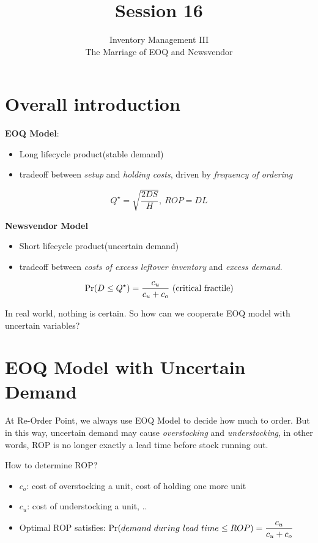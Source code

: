 \documentclass[11pt, a4paper]{ISOM2700}
\title{Session 16}
\subtitle{Inventory Management III\\The Marriage of EOQ and Newsvendor}
\begin{document}
\begin{spacing}{1.5}
    
    \section{Overall introduction}

    {\bf EOQ Model}:
    \begin{itemize}
        \item Long lifecycle product(stable demand)
        \item tradeoff between {\it setup} and {\it holding costs}, driven by {\it frequency of ordering}
    \end{itemize}
    $$Q^\star = \sqrt{\frac{2DS}{H}},\ ROP=DL$$

    {\bf Newsvendor Model}
    \begin{itemize}
        \item Short lifecycle product(uncertain demand)
        \item tradeoff between {\it costs of excess leftover inventory} and {\it excess demand}.
    \end{itemize}
    $$\Pr(D\le Q^\star)=\frac{c_u}{c_u+c_o}\  {\rm (critical\ fractile)}$$

    In real world, nothing is certain. So how can we cooperate EOQ model with uncertain variables?

    \section{EOQ Model with Uncertain Demand}

    At Re-Order Point, we always use EOQ Model to decide how much to order. But in this way,
    uncertain demand may cause {\it overstocking} and {\it understocking}, in other words,
    ROP is no longer exactly a lead time before stock running out.

    How to determine ROP?
    \begin{itemize}
        \item $c_o$: cost of overstocking a unit, cost of holding one more unit
        \item $c_u$: cost of understocking a unit, ..
        \item Optimal ROP satisfies: $\displaystyle \Pr(demand\ during\ lead\ time \le ROP)=\frac{c_u}{c_u+c_o}$
    \end{itemize}


\end{spacing}
\end{document}
